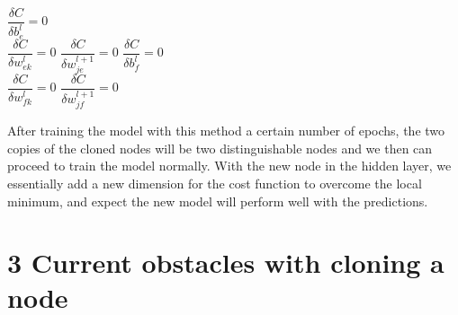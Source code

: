 \documentclass[12pt,english,]{article}
\let\origfigure\figure
\let\endorigfigure\endfigure
\renewenvironment{figure}[1][2] {
    \expandafter\origfigure\expandafter[H]
} {
    \endorigfigure
}
\begin{document}
\begin{figure}[ht]
  \centering
  \begin{minipage}{.9\linewidth}
    {\LinesNotNumbered
    \SetAlgoRefName{}
    \begin{algorithm}[H]
    \SetAlgoLined
    \BlankLine
    \centering
    \begin{minipage}{.75\linewidth}
         {
            $\dfrac{\delta C}{\delta b_{e}^{l}} = 0$\\
	     {
		$\dfrac{\delta C}{\delta w_{ek}^{l}} = 0$
	    }
	     {
		$\dfrac{\delta C}{\delta w_{je}^{l+1}} = 0$
	    }
        }
	 {
            $\dfrac{\delta C}{\delta b_{f}^{l}} = 0$\\
	     {
		$\dfrac{\delta C}{\delta w_{fk}^{l}} = 0$
	    }
	     {
		$\dfrac{\delta C}{\delta w_{jf}^{l+1}} = 0$
	    }
        }	
    \end{minipage}
    \caption{\textsc{Alternating node update method}}
    \end{algorithm}}
  \end{minipage}
\end{figure}

After training the model with this method a certain number of epochs, the two copies of the cloned nodes will be two distinguishable nodes and we then can proceed to train the model normally. With the new node in the hidden layer, we essentially add a new dimension for the cost function to overcome the local minimum, and expect the new model will perform well with the predictions.

\newpage

\hypertarget{section3}{%
\section{\texorpdfstring{3 \enspace Current obstacles with cloning a node}{3 Current obstacles with cloning a node}}\label{section3}}
\end{document}

